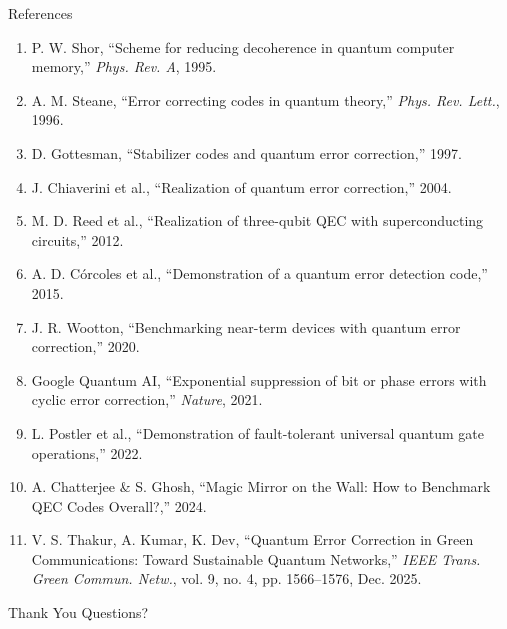 \documentclass[aspectratio=169]{beamer}
\begin{document}
\begin{frame}{References}
\footnotesize
\begin{enumerate}
    \item P. W. Shor, ``Scheme for reducing decoherence in quantum computer memory,'' \textit{Phys. Rev. A}, 1995.
    \item A. M. Steane, ``Error correcting codes in quantum theory,'' \textit{Phys. Rev. Lett.}, 1996.
    \item D. Gottesman, ``Stabilizer codes and quantum error correction,'' 1997.
    \item J. Chiaverini et al., ``Realization of quantum error correction,'' 2004.
    \item M. D. Reed et al., ``Realization of three-qubit QEC with superconducting circuits,'' 2012.
    \item A. D. C\'orcoles et al., ``Demonstration of a quantum error detection code,'' 2015.
    \item J. R. Wootton, ``Benchmarking near-term devices with quantum error correction,'' 2020.
    \item Google Quantum AI, ``Exponential suppression of bit or phase errors with cyclic error correction,'' \textit{Nature}, 2021.
    \item L. Postler et al., ``Demonstration of fault-tolerant universal quantum gate operations,'' 2022.
    \item A. Chatterjee \& S. Ghosh, ``Magic Mirror on the Wall: How to Benchmark QEC Codes Overall?,'' 2024.
    \item V. S. Thakur, A. Kumar, K. Dev, ``Quantum Error Correction in Green Communications: Toward Sustainable Quantum Networks,'' \textit{IEEE Trans. Green Commun. Netw.}, vol. 9, no. 4, pp. 1566--1576, Dec. 2025.
\end{enumerate}
\end{frame}
\begin{frame}
\centering
\vspace{1.5cm}
{\Huge Thank You}
\vspace{0.5cm}
{\large Questions?}
\end{frame}
\end{document}
